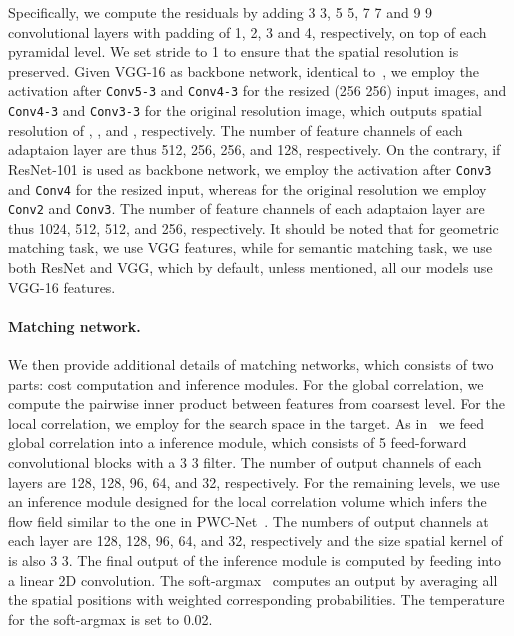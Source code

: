 \documentclass[10pt,twocolumn,letterpaper]{article}
\begin{document}
Specifically, we compute the residuals by adding 3  3, 5  5, 7  7 and 9  9 convolutional layers with padding of 1, 2, 3 and 4, respectively, on top of each pyramidal level. We set stride to 1 to ensure that the spatial resolution is preserved. Given VGG-16 as backbone network, identical to~\cite{truong2020glu}, we employ the activation after \verb|Conv5-3| and \verb|Conv4-3| for the resized (256  256) input images, and \verb|Conv4-3| and \verb|Conv3-3| for the original resolution image, which outputs spatial resolution of , ,  and , respectively. The number of feature channels of each adaptaion layer are thus 512, 256, 256, and 128, respectively. On the contrary, if ResNet-101 is used as backbone network, we employ the activation after \verb|Conv3| and \verb|Conv4| for the resized input, whereas for the original resolution we employ \verb|Conv2| and \verb|Conv3|. The number of feature channels of each adaptaion layer are thus 1024, 512, 512, and 256, respectively. 
It should be noted that for geometric matching task, we use VGG features, while for semantic matching task, we use both ResNet and VGG, which by default, unless mentioned, all our models use VGG-16 features. 
\vspace{-10pt}
	
\paragraph{Matching network.} We then provide additional details of matching networks, which consists of two parts: cost computation and inference modules. For the global correlation, we compute the pairwise inner product between features from coarsest level. For the local correlation, we employ  for the search space in the target. As in~\cite{melekhov2019dgc,truong2020glu} we feed global correlation into a inference module, which consists of 5 feed-forward convolutional blocks with a 3  3 filter. The number of output channels of each layers are 128, 128, 96, 64, and 32, respectively. For the remaining levels, we use an inference module designed for the local correlation volume which infers the flow field similar to the one in PWC-Net~\cite{sun2018pwc}. The numbers of output channels at each layer are 128, 128, 96, 64, and 32, respectively and the size spatial kernel of is also 3  3. The final output of the inference module is computed by feeding into a linear 2D convolution. The soft-argmax~\cite{kendall2017end} computes an output by averaging all the spatial positions with weighted corresponding probabilities. The temperature for the soft-argmax is set to 0.02. 
\end{document}
